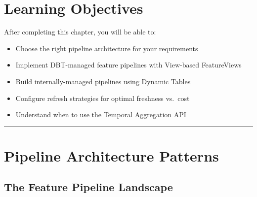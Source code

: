 \documentclass[
  letterpaper,
  DIV=11,
  numbers=noendperiod]{scrreprt}
\providecommand{\tightlist}{%
  \setlength{\itemsep}{0pt}\setlength{\parskip}{0pt}}\usepackage{longtable,booktabs,array}
\begin{document}
\hypertarget{learning-objectives-4}{%
\section{Learning Objectives}\label{learning-objectives-4}}

After completing this chapter, you will be able to:

\begin{itemize}
\tightlist
\item
  Choose the right pipeline architecture for your requirements
\item
  Implement DBT-managed feature pipelines with View-based FeatureViews
\item
  Build internally-managed pipelines using Dynamic Tables
\item
  Configure refresh strategies for optimal freshness vs.~cost
\item
  Understand when to use the Temporal Aggregation API
\end{itemize}

\begin{center}\rule{0.5\linewidth}{0.5pt}\end{center}

\hypertarget{pipeline-architecture-patterns}{%
\section{Pipeline Architecture
Patterns}\label{pipeline-architecture-patterns}}

\hypertarget{the-feature-pipeline-landscape}{%
\subsection{The Feature Pipeline
Landscape}\label{the-feature-pipeline-landscape}}
\end{document}
